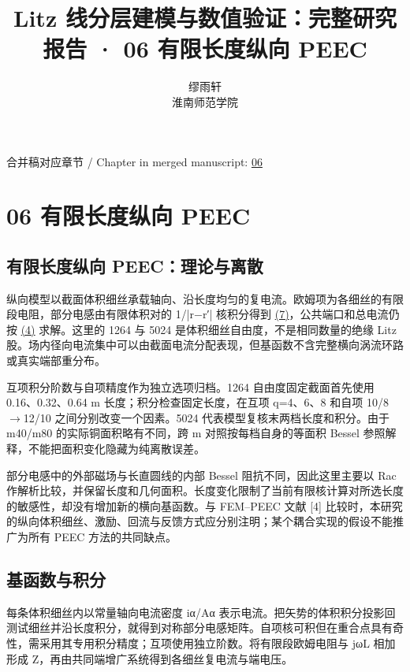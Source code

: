 \documentclass[11pt]{article}
\begin{document}
\title{Litz 线分层建模与数值验证：完整研究报告 · 06 有限长度纵向 PEEC}
\author{缪雨轩\\淮南师范学院}
\date{}
\maketitle
\noindent 合并稿对应章节 / Chapter in merged manuscript: \href{report_zh-CN_single.pdf#chapter-06}{06}\par
\FloatBarrier
\section*{06 有限长度纵向 PEEC}
\hypertarget{chapter-06}{}
\subsection*{有限长度纵向 PEEC：理论与离散}
\hypertarget{06.peec_method.heading}{}
纵向模型以截面体积细丝承载轴向、沿长度均匀的复电流。欧姆项为各细丝的有限段电阻，部分电感由有限体积对的 1/|r−r′| 核积分得到 \href{report_zh-CN_single.pdf#E08}{(7)}，公共端口和总电流仍按 \href{report_zh-CN_single.pdf#E04}{(4)} 求解。这里的 1264 与 5024 是体积细丝自由度，不是相同数量的绝缘 Litz 股。场内径向电流集中可以由截面电流分配表现，但基函数不含完整横向涡流环路或真实端部重分布。


互项积分阶数与自项精度作为独立选项归档。1264 自由度固定截面首先使用 0.16、0.32、0.64 m 长度；积分检查固定长度，在互项 q=4、6、8 和自项 10/8\(\to\)12/10 之间分别改变一个因素。5024 代表模型复核末两档长度和积分。由于 m40/m80 的实际铜面积略有不同，跨 m 对照按每档自身的等面积 Bessel 参照解释，不能把面积变化隐藏为纯离散误差。


部分电感中的外部磁场与长直圆线的内部 Bessel 阻抗不同，因此这里主要以 Rac 作解析比较，并保留长度和几何面积。长度变化限制了当前有限核计算对所选长度的敏感性，却没有增加新的横向基函数。与 FEM–PEEC 文献 [4] 比较时，本研究的纵向体积细丝、激励、回流与反馈方式应分别注明；某个耦合实现的假设不能推广为所有 PEEC 方法的共同缺点。


\subsection*{基函数与积分}
\hypertarget{06.peec_derivation.heading}{}
每条体积细丝内以常量轴向电流密度 iα/Aα 表示电流。把矢势的体积积分投影回测试细丝并沿长度积分，就得到对称部分电感矩阵。自项核可积但在重合点具有奇性，需采用其专用积分精度；互项使用独立阶数。将有限段欧姆电阻与 jωL 相加形成 Z，再由共同端增广系统得到各细丝复电流与端电压。
\end{document}
